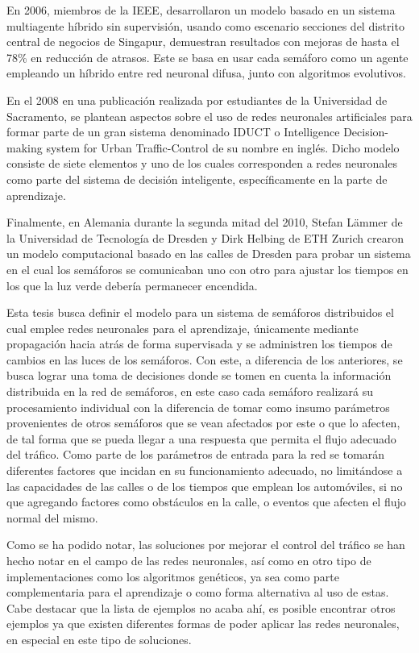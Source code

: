 		En 2006, miembros de la IEEE, desarrollaron un modelo basado en un sistema
	multiagente h\'{i}brido sin supervisi\'{o}n, usando como escenario secciones del
	distrito central de negocios de Singapur, demuestran resultados con mejoras de
	hasta el 78\% en reducci\'{o}n de atrasos. Este se basa en usar cada sem\'{a}foro como
	un agente empleando un h\'{i}brido entre red neuronal difusa, junto con algoritmos
	evolutivos. \cite{Srinivasan2006}
	
		En el 2008 en una publicaci\'{o}n realizada por estudiantes de la Universidad de
	Sacramento, se plantean aspectos sobre el uso de redes neuronales
	artificiales para formar parte de un gran sistema denominado IDUCT o
	Intelligence Decision-making system for Urban Traffic-Control de su nombre en
	ingl\'{e}s. Dicho modelo consiste de siete elementos y uno de los cuales
	corresponden a redes neuronales como parte del sistema de decisi\'{o}n
	inteligente, espec\'{i}ficamente en la parte de aprendizaje.
	\cite{Krishnani2008}

		Finalmente, en Alemania durante la segunda mitad del 2010, Stefan L\"{a}mmer
	de la Universidad de Tecnolog\'{i}a de Dresden y Dirk Helbing de ETH Zurich crearon un
	modelo computacional basado en las calles de Dresden para probar un sistema en
	el cual los sem\'{a}foros se comunicaban uno con otro para ajustar los tiempos
	en los que la luz verde deber\'{i}a permanecer encendida.\cite{Ben2010}
	
		Esta tesis busca definir el modelo para un sistema de sem\'{a}foros distribuidos
	el cual emplee redes neuronales para el aprendizaje, \'{u}nicamente mediante
	propagaci\'{o}n hacia atr\'{a}s de forma supervisada y se administren los tiempos de
	cambios en las luces de los sem\'{a}foros. Con este, a diferencia de los
	anteriores, se busca lograr una toma de decisiones donde se tomen en cuenta la informaci\'{o}n distribuida en la red de sem\'{a}foros, en este caso cada sem\'{a}foro realizar\'{a} su procesamiento individual con la diferencia de tomar como insumo par\'{a}metros provenientes de otros sem\'{a}foros que se vean afectados por este o que lo afecten, de tal forma que se pueda llegar a una respuesta que permita el flujo adecuado del tr\'{a}fico. Como parte de los par\'{a}metros de entrada para la red se tomar\'{a}n diferentes factores que incidan en su funcionamiento adecuado, no limit\'{a}ndose a las capacidades de las calles o de los tiempos que emplean los autom\'{o}viles, si no que agregando factores como obst\'{a}culos en la calle, o eventos que afecten el flujo normal del mismo.
	
		Como se ha podido notar, las soluciones por mejorar el control del tr\'{a}fico se
	han hecho notar en el campo de las redes neuronales, as\'{i} como en otro tipo
	de implementaciones como los algoritmos gen\'{e}ticos, ya sea como parte
	complementaria para el aprendizaje o como forma alternativa al uso de estas.
	\cite{Ayad} Cabe destacar que la lista de ejemplos no acaba ah\'{i}, es posible
	encontrar otros ejemplos ya que existen diferentes formas de poder aplicar las redes neuronales, en especial en este tipo de soluciones.
